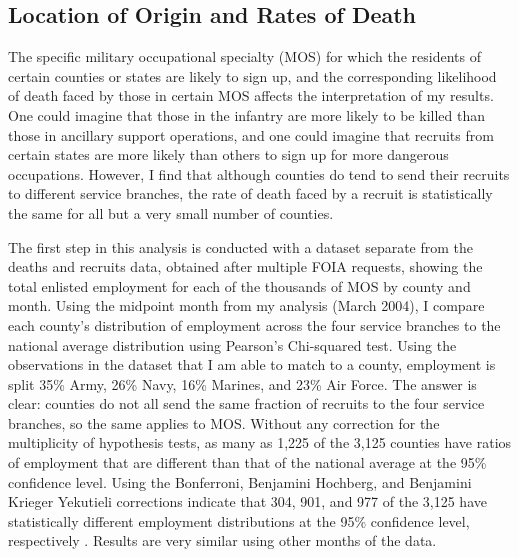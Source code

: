 \documentclass[12pt] {article}
\begin{document}
\subsection{Location of Origin and Rates of Death\label{sec:deathrate}}
The specific military occupational specialty (MOS) for which the residents of certain counties or states are likely to sign up, and the corresponding likelihood of death faced by those in certain MOS affects the interpretation of my results. One could imagine that those in the infantry are more likely to be killed than those in ancillary support operations, and one could imagine that recruits from certain states are more likely than others to sign up for more dangerous occupations. However, I find that although counties do tend to send their recruits to different service branches, the rate of death faced by a recruit is statistically the same for all but a very small number of counties.  %

The first step in this analysis is conducted with a dataset separate from the deaths and recruits data, obtained after multiple FOIA requests, showing the total enlisted employment for each of the thousands of MOS by county and month. Using the midpoint month from my analysis (March 2004), I compare each county's distribution of employment across the four service branches to the national average distribution  using Pearson's Chi-squared test. Using the observations in the dataset that I am able to match to a county, employment is split 35\% Army, 26\% Navy, 16\% Marines, and 23\% Air Force. The answer is clear: counties do not all send the same fraction of recruits to the four service branches, so the same applies to MOS. Without any correction for the multiplicity of hypothesis tests, as many as 1,225 of the 3,125 counties have ratios of employment that are different than that of the national average at the 95\% confidence level. Using the Bonferroni, Benjamini Hochberg, and Benjamini Krieger Yekutieli corrections indicate that 304, 901, and 977 of the 3,125 have statistically different employment distributions at the 95\% confidence level, respectively \citep{BenHoch1995, BKY2006}. Results are very similar using other months of the data.
\end{document}
